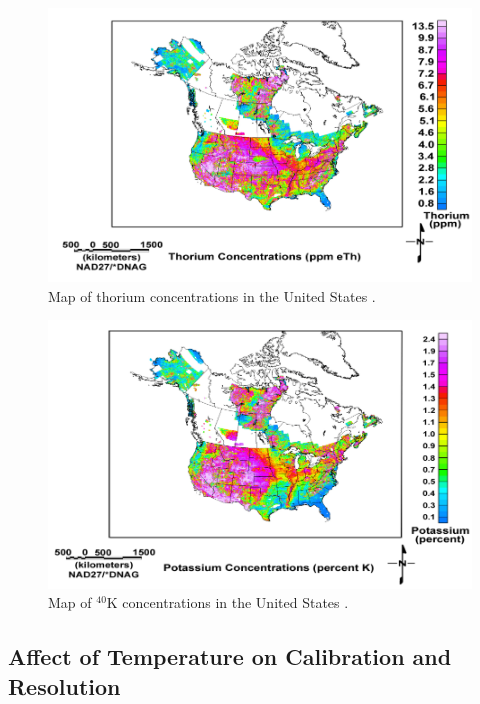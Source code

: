 \begin{figure}[H]
\centering
\includegraphics[width=0.9\linewidth]{images/USGS_th_conc}
\caption{Map of thorium concentrations in the United States \cite{USGS}.}
\label{fig:USGS_th_conc}
\end{figure}

\begin{figure}[H]
\centering
\includegraphics[width=0.9\linewidth]{images/USGS_k_conc}
\caption{Map of $^{40}$K concentrations in the United States \cite{USGS}.}
\label{fig:USGS_k_conc}
\end{figure}



\subsection{Affect of Temperature on Calibration and Resolution}


